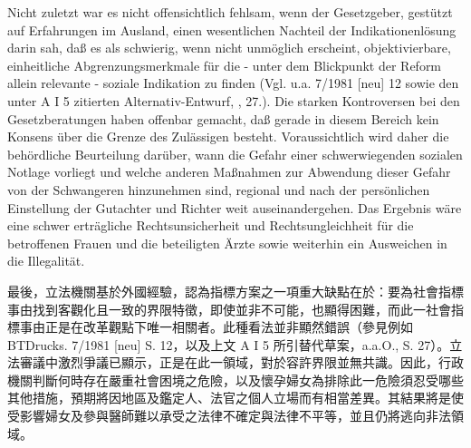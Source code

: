 \documentclass[12pt]{article}
\begin{document}
\syncleft
\begin{sourcepara}
Nicht zuletzt war es nicht offensichtlich fehlsam, wenn der Gesetzgeber, gestützt auf Erfahrungen im Ausland, einen wesentlichen Nachteil der Indikationenlösung darin sah, daß es als schwierig, wenn nicht unmöglich erscheint, objektivierbare, einheitliche Abgrenzungsmerkmale für die - unter dem Blickpunkt der Reform allein relevante - soziale Indikation zu finden (Vgl. u.a. \abbrBTDrucks{} 7/1981 [neu] \abbrS{} 12 sowie den unter A I 5 zitierten Alternativ-Entwurf, \abbrAAO{}, \abbrS{} 27.). Die starken Kontroversen bei den Gesetzberatungen haben offenbar gemacht, daß gerade in diesem Bereich kein Konsens über die Grenze des Zulässigen besteht. Voraussichtlich wird daher die behördliche Beurteilung darüber, wann die Gefahr einer schwerwiegenden sozialen Notlage vorliegt und welche anderen Maßnahmen zur Abwendung dieser Gefahr von der Schwangeren hinzunehmen sind, regional und nach der persönlichen Einstellung der Gutachter und Richter weit auseinandergehen. Das Ergebnis wäre eine schwer erträgliche Rechtsunsicherheit und Rechtsungleichheit für die betroffenen Frauen und die beteiligten Ärzte sowie weiterhin ein Ausweichen in die Illegalität.
\end{sourcepara}
\begin{transpara}
最後，立法機關基於外國經驗，認為指標方案之一項重大缺點在於：要為社會指標事由找到客觀化且一致的界限特徵，即使並非不可能，也顯得困難，而此一社會指標事由正是在改革觀點下唯一相關者。此種看法並非顯然錯誤（參見例如 BTDrucks. 7/1981 [neu] S. 12，以及上文 A I 5 所引替代草案，a.a.O., S. 27）。立法審議中激烈爭議已顯示，正是在此一領域，對於容許界限並無共識。因此，行政機關判斷何時存在嚴重社會困境之危險，以及懷孕婦女為排除此一危險須忍受哪些其他措施，預期將因地區及鑑定人、法官之個人立場而有相當差異。其結果將是使受影響婦女及參與醫師難以承受之法律不確定與法律不平等，並且仍將逃向非法領域。
\end{transpara}
\end{document}
